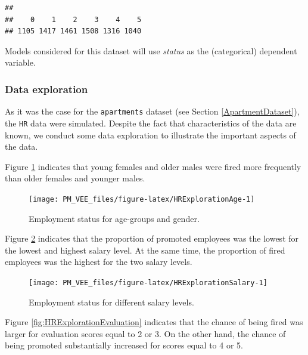 \documentclass[12pt,]{krantz}
\begin{document}
\begin{verbatim}
## 
##    0    1    2    3    4    5 
## 1105 1417 1461 1508 1316 1040
\end{verbatim}

Models considered for this dataset will use \emph{status} as the (categorical) dependent variable.

\hypertarget{exploration-HR}{%
\subsubsection{Data exploration}\label{exploration-HR}}

As it was the case for the \texttt{apartments} dataset (see Section \ref{ApartmentDataset}), the \texttt{HR} data were simulated. Despite the fact that characteristics of the data are known, we conduct some data exploration to illustrate the important aspects of the data.

Figure \ref{fig:HRExplorationAge} indicates that young females and older males were fired more frequently than older females and younger males.

\begin{figure}

{\centering \texttt{[image: PM\_VEE\_files/figure-latex/HRExplorationAge-1]} 

}

\caption{Employment status for age-groups and gender.}\label{fig:HRExplorationAge}
\end{figure}

Figure \ref{fig:HRExplorationSalary} indicates that the proportion of promoted employees was the lowest for the lowest and highest salary level. At the same time, the proportion of fired employees was the highest for the two salary levels.

\begin{figure}

{\centering \texttt{[image: PM\_VEE\_files/figure-latex/HRExplorationSalary-1]} 

}

\caption{Employment status for different salary levels.}\label{fig:HRExplorationSalary}
\end{figure}

Figure \ref{fig:HRExplorationEvaluation} indicates that the chance of being fired was larger for evaluation scores equal to 2 or 3. On the other hand, the chance of being promoted substantially increased for scores equal to 4 or 5.\\
\end{document}
